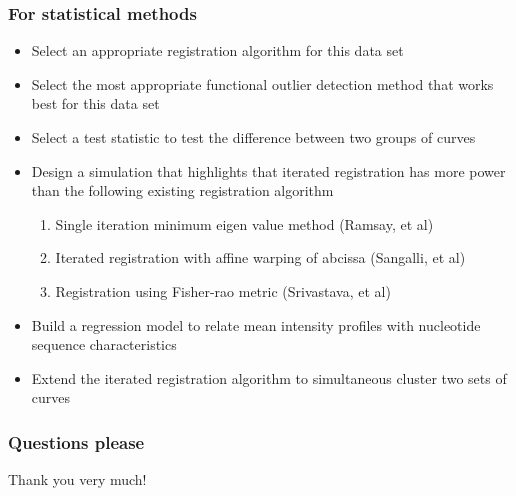 \documentclass[10pt,dvipsnames,table]{beamer}
\begin{document}
\begin{frame}
\frametitle{For statistical methods}
\begin{itemize}
\item[\checkmark] Select an appropriate registration algorithm for this data set
\item[\checkmark] Select the most appropriate functional outlier detection method that works best for this data set
\item[\checkmark] Select a test statistic to test the difference between two groups of curves
\item Design a simulation that highlights that iterated registration has more power than the following existing registration algorithm
\begin{enumerate}
\item Single iteration minimum eigen value method (Ramsay, et al)
\item Iterated registration with affine warping of abcissa (Sangalli, et al)
\item Registration using Fisher-rao metric (Srivastava, et al)
\end{enumerate}
\item Build a regression model to relate mean intensity profiles with nucleotide sequence characteristics
\item Extend the iterated registration algorithm to simultaneous cluster two sets of curves
\end{itemize}
\end{frame}

\begin{frame}
\frametitle{Questions please}

Thank you very much!

\end{frame}

\begin{frame}
    {\footnotesize
    
    
    }
\end{frame}
\end{document}
